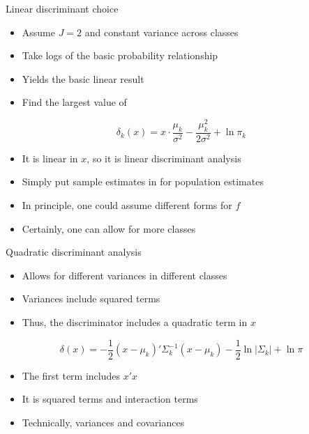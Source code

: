 \documentclass[
  ignorenonframetext,
]{beamer}
\providecommand{\tightlist}{%
  \setlength{\itemsep}{0pt}\setlength{\parskip}{0pt}}
\begin{document}
\begin{frame}{Linear discriminant choice}
\protect{}\label{linear-discriminant-choice}
\begin{itemize}
\tightlist
\item
  Assume \(J=2\) and constant variance across classes
\item
  Take logs of the basic probability relationship
\item
  Yields the basic linear result
\item
  Find the largest value of
\end{itemize}

\[
\delta_k(x) = x \cdot \frac{\mu_k}{\sigma^2} - \frac{\mu_k^2}{2\sigma^2}+\ln \pi_k
\]

\begin{itemize}
\tightlist
\item
  It is linear in \(x\), so it is linear discriminant analysis
\item
  Simply put sample estimates in for population estimates
\item
  In principle, one could assume different forms for \(f\)
\item
  Certainly, one can allow for more classes
\end{itemize}
\end{frame}

\begin{frame}{Quadratic discriminant analysis}
\protect{}\label{quadratic-discriminant-analysis}
\begin{itemize}
\tightlist
\item
  Allows for different variances in different classes
\item
  Variances include squared terms
\item
  Thus, the discriminator includes a quadratic term in \(x\)
\end{itemize}

\[
\delta(x) = -\frac{1}{2} \left(x-\mu_k \right)' \Sigma^{-1}_k \left(x-\mu_k \right) -\frac{1}{2} \ln \left| \Sigma_k \right|  + \ln \pi 
\]

\begin{itemize}
\tightlist
\item
  The first term includes \(x'x\)
\item
  It is squared terms and interaction terms
\item
  Technically, variances and covariances
\end{itemize}
\end{frame}
\end{document}
